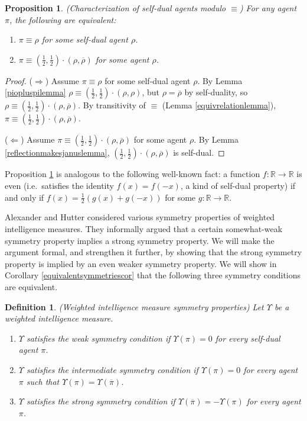 \documentclass[twoside]{article}
\newtheorem{definition}[theorem]{Definition}
\newtheorem{proposition}[theorem]{Proposition}
\begin{document}
\begin{proposition}
\label{janusagentcharacterizationproposition}
    (Characterization of self-dual agents modulo $\equiv$)
    For any agent $\pi$, the following are equivalent:
    \begin{enumerate}
        \item $\pi\equiv\rho$ for some self-dual agent $\rho$.
        \item $\pi\equiv(\frac12,\frac12)\cdot(\rho,\overline{\rho})$
            for some agent $\rho$.
    \end{enumerate}
\end{proposition}

\begin{proof}
    ($\Rightarrow$)
    Assume $\pi\equiv\rho$ for some self-dual agent $\rho$.
    By Lemma \ref{piopluspilemma}
    $\rho\equiv (\frac12,\frac12)\cdot(\rho,\rho)$,
    but $\rho=\overline{\rho}$ by self-duality,
    so
    $\rho\equiv (\frac12,\frac12)\cdot(\rho,\overline{\rho})$.
    By transitivity of $\equiv$ (Lemma \ref{equivrelationlemma}),
    $\pi\equiv(\frac12,\frac12)\cdot(\rho,\overline{\rho})$.

    ($\Leftarrow$)
    Assume $\pi\equiv(\frac12,\frac12)\cdot(\rho,\overline{\rho})$ for some agent $\rho$.
    By Lemma \ref{reflectionmakesjanuslemma},
    $(\frac12,\frac12)\cdot(\rho,\overline{\rho})$ is self-dual.
\end{proof}

Proposition \ref{janusagentcharacterizationproposition} is analogous to the
following well-known fact: a function $f:\mathbb R\to\mathbb R$ is even
(i.e.\ satisfies the identity $f(x)=f(-x)$, a kind of self-dual property)
if and only if $f(x)=\frac12(g(x)+g(-x))$ for some $g:\mathbb R\to\mathbb R$.

Alexander and Hutter \cite{alexander2021reward} considered various symmetry properties of
weighted intelligence measures. They informally argued that a
certain somewhat-weak symmetry property implies a strong symmetry property.
We will make the argument formal, and strengthen it further,
by showing that the strong symmetry property is implied by an
even weaker symmetry property. We will show in Corollary \ref{equivalentsymmetriescor} that
the following three symmetry conditions are equivalent.

\begin{definition}
    (Weighted intelligence measure symmetry properties)
    Let $\Upsilon$ be a weighted intelligence measure.
    \begin{enumerate}
        \item $\Upsilon$ \emph{satisfies the weak symmetry condition}
            if $\Upsilon(\pi)=0$ for every self-dual agent $\pi$.
        \item $\Upsilon$ \emph{satisfies the intermediate symmetry condition}
            if $\Upsilon(\pi)=0$ for every agent $\pi$
            such that $\Upsilon(\pi)=\Upsilon(\overline\pi)$.
        \item $\Upsilon$ \emph{satisfies the strong symmetry condition}
            if $\Upsilon(\overline\pi)=-\Upsilon(\pi)$ for every agent $\pi$.
    \end{enumerate}
\end{definition}
\end{document}
